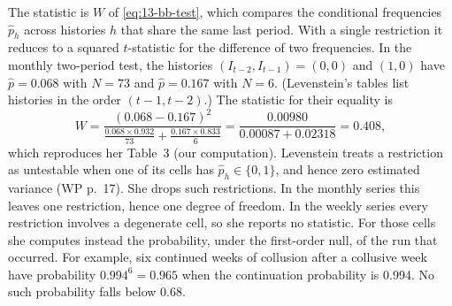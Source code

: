 The statistic is $W$ of \eqref{eq:13-bb-test}, which compares the conditional frequencies $\hat p_h$ across
histories $h$ that share the same last period. With a single restriction it reduces to a squared $t$-statistic for
the difference of two frequencies. In the monthly two-period test, the histories $(I_{t-2}, I_{t-1}) = (0,0)$ and
$(1,0)$ have $\hat p = 0.068$ with $N = 73$ and $\hat p = 0.167$ with $N = 6$. (Levenstein's tables list histories
in the order $(t-1, t-2)$.) The statistic for their equality is
\begin{equation*}
  W = \frac{(0.068 - 0.167)^2}{\frac{0.068 \times 0.932}{73} + \frac{0.167 \times 0.833}{6}}
    = \frac{0.00980}{0.00087 + 0.02318} = 0.408 ,
\end{equation*}
which reproduces her Table~3 (our computation). Levenstein treats a restriction as untestable when one of its cells
has $\hat p_h \in \{0, 1\}$, and hence zero estimated variance (WP p.~17). She drops such restrictions. In the
monthly series this leaves one restriction, hence one degree of freedom. In the weekly series every restriction
involves a degenerate cell, so she reports no statistic. For those cells she computes instead the probability, under
the first-order null, of the run that occurred. For example, six continued weeks of collusion after a collusive
week have probability $0.994^{6} = 0.965$ when the continuation probability is 0.994. No such probability falls
below 0.68.

